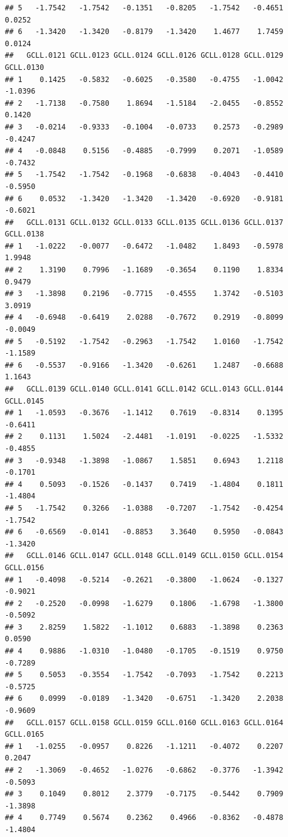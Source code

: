 \documentclass[
]{article}
\begin{document}
\begin{verbatim}
## 5   -1.7542   -1.7542   -0.1351   -0.8205   -1.7542   -0.4651    0.0252
## 6   -1.3420   -1.3420   -0.8179   -1.3420    1.4677    1.7459    0.0124
##   GCLL.0121 GCLL.0123 GCLL.0124 GCLL.0126 GCLL.0128 GCLL.0129 GCLL.0130
## 1    0.1425   -0.5832   -0.6025   -0.3580   -0.4755   -1.0042   -1.0396
## 2   -1.7138   -0.7580    1.8694   -1.5184   -2.0455   -0.8552    0.1420
## 3   -0.0214   -0.9333   -0.1004   -0.0733    0.2573   -0.2989   -0.4247
## 4   -0.0848    0.5156   -0.4885   -0.7999    0.2071   -1.0589   -0.7432
## 5   -1.7542   -1.7542   -0.1968   -0.6838   -0.4043   -0.4410   -0.5950
## 6    0.0532   -1.3420   -1.3420   -1.3420   -0.6920   -0.9181   -0.6021
##   GCLL.0131 GCLL.0132 GCLL.0133 GCLL.0135 GCLL.0136 GCLL.0137 GCLL.0138
## 1   -1.0222   -0.0077   -0.6472   -1.0482    1.8493   -0.5978    1.9948
## 2    1.3190    0.7996   -1.1689   -0.3654    0.1190    1.8334    0.9479
## 3   -1.3898    0.2196   -0.7715   -0.4555    1.3742   -0.5103    3.0919
## 4   -0.6948   -0.6419    2.0288   -0.7672    0.2919   -0.8099   -0.0049
## 5   -0.5192   -1.7542   -0.2963   -1.7542    1.0160   -1.7542   -1.1589
## 6   -0.5537   -0.9166   -1.3420   -0.6261    1.2487   -0.6688    1.1643
##   GCLL.0139 GCLL.0140 GCLL.0141 GCLL.0142 GCLL.0143 GCLL.0144 GCLL.0145
## 1   -1.0593   -0.3676   -1.1412    0.7619   -0.8314    0.1395   -0.6411
## 2    0.1131    1.5024   -2.4481   -1.0191   -0.0225   -1.5332   -0.4855
## 3   -0.9348   -1.3898   -1.0867    1.5851    0.6943    1.2118   -0.1701
## 4    0.5093   -0.1526   -0.1437    0.7419   -1.4804    0.1811   -1.4804
## 5   -1.7542    0.3266   -1.0388   -0.7207   -1.7542   -0.4254   -1.7542
## 6   -0.6569   -0.0141   -0.8853    3.3640    0.5950   -0.0843   -1.3420
##   GCLL.0146 GCLL.0147 GCLL.0148 GCLL.0149 GCLL.0150 GCLL.0154 GCLL.0156
## 1   -0.4098   -0.5214   -0.2621   -0.3800   -1.0624   -0.1327   -0.9021
## 2   -0.2520   -0.0998   -1.6279    0.1806   -1.6798   -1.3800   -0.5092
## 3    2.8259    1.5822   -1.1012    0.6883   -1.3898    0.2363    0.0590
## 4    0.9886   -1.0310   -1.0480   -0.1705   -0.1519    0.9750   -0.7289
## 5    0.5053   -0.3554   -1.7542   -0.7093   -1.7542    0.2213   -0.5725
## 6    0.0999   -0.0189   -1.3420   -0.6751   -1.3420    2.2038   -0.9609
##   GCLL.0157 GCLL.0158 GCLL.0159 GCLL.0160 GCLL.0163 GCLL.0164 GCLL.0165
## 1   -1.0255   -0.0957    0.8226   -1.1211   -0.4072    0.2207    0.2047
## 2   -1.3069   -0.4652   -1.0276   -0.6862   -0.3776   -1.3942   -0.5093
## 3    0.1049    0.8012    2.3779   -0.7175   -0.5442    0.7909   -1.3898
## 4    0.7749    0.5674    0.2362    0.4966   -0.8362   -0.4878   -1.4804

\end{verbatim}
\end{document}
